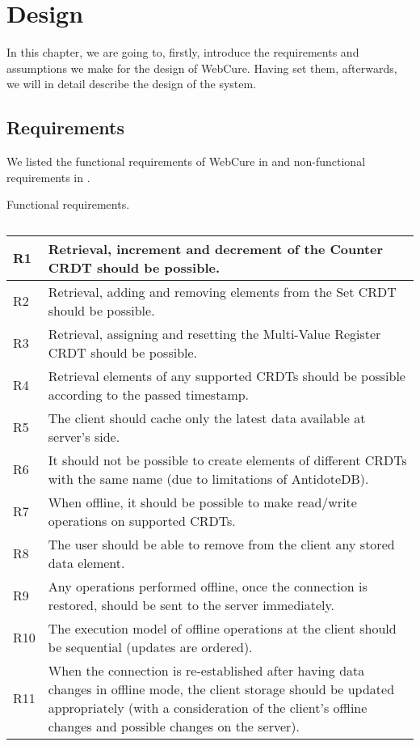 \chapter{Design}
\label{Design}

In this chapter, we are going to, firstly, introduce the requirements and assumptions we make for the design of WebCure. Having set them, afterwards, we will in detail describe the design of the system.

\section{Requirements}
\label{4-Requirements}

We listed the functional requirements of WebCure in  and non-functional requirements in .

\begin{table}[!htbp]
\centering
\caption{Functional requirements.}
\label{table:req1}
\begin{tabular}{|p{1cm}|p{14cm}|}
\hline
R1 & Retrieval, increment and decrement of the Counter CRDT should be possible.                         \\ \hline
R2 & Retrieval, adding and removing elements from the Set CRDT should be possible.                       \\ \hline
R3 & Retrieval, assigning and resetting the Multi-Value Register CRDT should be possible.               \\ \hline
R4 & Retrieval elements of any supported CRDTs should be possible according to the passed timestamp. \\ \hline
R5 & The client should cache only the latest data available at server's side. \\ \hline
R6 & It should not be possible to create elements of different CRDTs with the same name (due to limitations of AntidoteDB). \\ \hline
R7 & When offline, it should be possible to make read/write operations on supported CRDTs. \\ \hline
R8 & The user should be able to remove from the client any stored data element. \\ \hline
R9 & Any operations performed offline, once the connection is restored, should be sent to the server immediately. \\ \hline
R10 & The execution model of offline operations at the client should be sequential (updates are ordered). \\ \hline 
R11 & When the connection is re-established after having data changes in offline mode, the client storage should be updated appropriately (with a consideration of the client's offline changes and possible changes on the server). \\ \hline
\end{tabular}
\caption*{}
\end{table}

